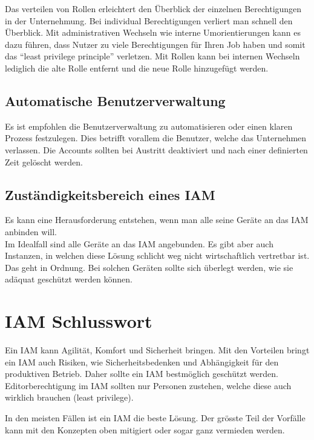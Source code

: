 Das verteilen von Rollen erleichtert den Überblick der einzelnen Berechtigungen in der Unternehmung.
Bei individual Berechtigungen verliert man schnell den Überblick.
Mit administrativen Wechseln wie interne Umorientierungen kann es dazu führen, dass Nutzer zu viele Berechtigungen für Ihren Job haben und somit das ``least privilege principle'' verletzen.
Mit Rollen kann bei internen Wechseln lediglich die alte Rolle entfernt und die neue Rolle hinzugefügt werden.


\subsection{Automatische Benutzerverwaltung}
Es ist empfohlen die Benutzerverwaltung zu automatisieren oder einen klaren Prozess festzulegen.
Dies betrifft vorallem die Benutzer, welche das Unternehmen verlassen.
Die Accounts sollten bei Austritt deaktiviert und nach einer definierten Zeit gelöscht werden.


\subsection{Zuständigkeitsbereich eines IAM}
Es kann eine Herausforderung entstehen, wenn man alle seine Geräte an das IAM anbinden will.\\

Im Idealfall sind alle Geräte an das IAM angebunden.
Es gibt aber auch Instanzen, in welchen diese Lösung schlicht weg nicht wirtschaftlich vertretbar ist.
Das geht in Ordnung.
Bei solchen Geräten sollte sich überlegt werden, wie sie adäquat geschützt werden können.

\section{IAM Schlusswort}
Ein IAM kann Agilität, Komfort und Sicherheit bringen.
Mit den Vorteilen bringt ein IAM auch Risiken, wie Sicherheitsbedenken und Abhängigkeit für den produktiven Betrieb.
Daher sollte ein IAM bestmöglich geschützt werden.
Editorberechtigung im IAM sollten nur Personen zustehen, welche diese auch wirklich brauchen (least privilege).

In den meisten Fällen ist ein IAM die beste Lösung.
Der grösste Teil der Vorfälle kann mit den Konzepten oben mitigiert oder sogar ganz vermieden werden.